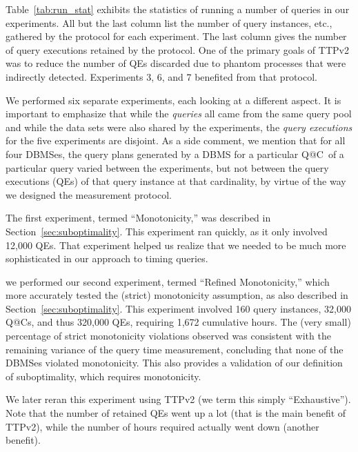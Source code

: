 \documentclass[prodmode,acmtods]{acmsmall}
\makeatletter
\def\QatC{Q{@}C}
\makeatother
\begin{document}
Table~\ref{tab:run_stat} exhibits the statistics of running a number of 
queries in our experiments. All but the last column list the number of query
instances, etc., gathered by the protocol for each experiment. The last
column gives the number of query executions retained by the protocol. One of
the primary goals of TTPv2 was to reduce the number of QEs discarded due to
phantom processes that were indirectly detected. Experiments 3, 6, and 7
benefited from that protocol.

We performed six separate experiments, each looking at a different
aspect. It is important to emphasize that while the {\em queries} all came
from the same query pool and while the data sets were also shared by the
experiments, the {\em query executions} for the five experiments are
disjoint. As a side comment, we mention that for all four \hbox{DBMSes}, the query
plans generated by a \hbox{DBMS} for a particular \QatC\ of a particular query
varied between the experiments, but not between the query executions (QEs) of that query
instance at that cardinality, by virtue of the way we designed the
measurement protocol.

The first experiment, termed ``Monotonicity,'' was described in
Section~\ref{sec:suboptimality}. This experiment ran quickly, as it
only involved 12,000 QEs. That experiment helped us realize that we needed
to be much more sophisticated in our approach to timing queries.

 we performed our
second experiment, termed ``Refined Monotonicity,'' which more accurately tested the
(strict) monotonicity assumption, as also described in
Section~\ref{sec:suboptimality}.
This experiment involved 160 query instances, 32,000 \QatC s, and thus
320,000 QEs, requiring 1,672 cumulative hours.  The (very small) percentage %
of strict monotonicity violations observed was consistent with the remaining
variance of the query time measurement, concluding that none of
the \hbox{DBMSes} violated monotonicity. This also provides a validation of
our definition of suboptimality, which requires monotonicity.

We later reran this experiment using TTPv2 (we term this simply
``Exhaustive''). Note that the number of retained QEs went up a lot (that is
the main benefit of TTPv2), while the number of hours required actually
went down (another benefit).
\end{document}
